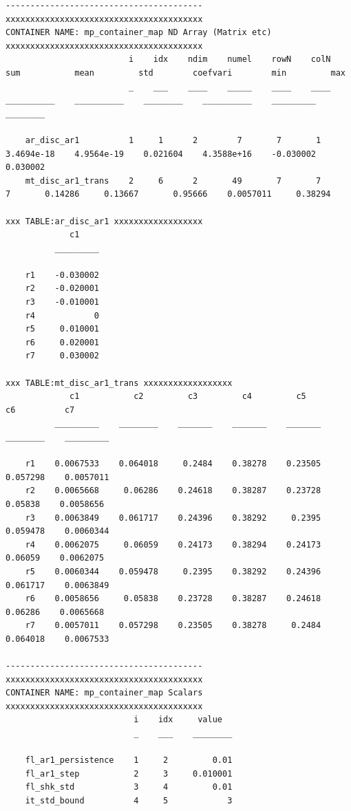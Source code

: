 \documentclass[
]{book}
\begin{document}
\begin{verbatim}
----------------------------------------
xxxxxxxxxxxxxxxxxxxxxxxxxxxxxxxxxxxxxxxx
CONTAINER NAME: mp_container_map ND Array (Matrix etc)
xxxxxxxxxxxxxxxxxxxxxxxxxxxxxxxxxxxxxxxx
                         i    idx    ndim    numel    rowN    colN       sum           mean         std        coefvari        min         max   
                         _    ___    ____    _____    ____    ____    __________    __________    ________    __________    _________    ________

    ar_disc_ar1          1     1      2        7       7       1      3.4694e-18    4.9564e-19    0.021604    4.3588e+16    -0.030002    0.030002
    mt_disc_ar1_trans    2     6      2       49       7       7               7       0.14286     0.13667       0.95666    0.0057011     0.38294

xxx TABLE:ar_disc_ar1 xxxxxxxxxxxxxxxxxx
             c1    
          _________

    r1    -0.030002
    r2    -0.020001
    r3    -0.010001
    r4            0
    r5     0.010001
    r6     0.020001
    r7     0.030002

xxx TABLE:mt_disc_ar1_trans xxxxxxxxxxxxxxxxxx
             c1           c2         c3         c4         c5          c6          c7    
          _________    ________    _______    _______    _______    ________    _________

    r1    0.0067533    0.064018     0.2484    0.38278    0.23505    0.057298    0.0057011
    r2    0.0065668     0.06286    0.24618    0.38287    0.23728     0.05838    0.0058656
    r3    0.0063849    0.061717    0.24396    0.38292     0.2395    0.059478    0.0060344
    r4    0.0062075     0.06059    0.24173    0.38294    0.24173     0.06059    0.0062075
    r5    0.0060344    0.059478     0.2395    0.38292    0.24396    0.061717    0.0063849
    r6    0.0058656     0.05838    0.23728    0.38287    0.24618     0.06286    0.0065668
    r7    0.0057011    0.057298    0.23505    0.38278     0.2484    0.064018    0.0067533

----------------------------------------
xxxxxxxxxxxxxxxxxxxxxxxxxxxxxxxxxxxxxxxx
CONTAINER NAME: mp_container_map Scalars
xxxxxxxxxxxxxxxxxxxxxxxxxxxxxxxxxxxxxxxx
                          i    idx     value  
                          _    ___    ________

    fl_ar1_persistence    1     2         0.01
    fl_ar1_step           2     3     0.010001
    fl_shk_std            3     4         0.01
    it_std_bound          4     5            3
\end{verbatim}
\end{document}
